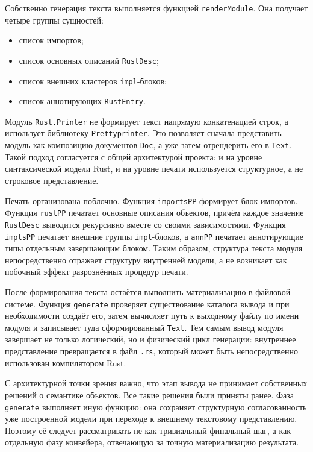 \documentclass[a4paper,12pt]{article}
\begin{document}
Собственно генерация текста выполняется функцией \texttt{renderModule}. Она получает
четыре группы сущностей:
\begin{itemize}
  \item список импортов;
  \item список основных описаний \texttt{RustDesc};
  \item список внешних кластеров \texttt{impl}-блоков;
  \item список аннотирующих \texttt{RustEntry}.
\end{itemize}

Модуль \texttt{Rust.Printer} не формирует текст напрямую конкатенацией строк, а
использует библиотеку \texttt{Prettyprinter}. Это позволяет сначала представить модуль
как композицию документов \texttt{Doc}, а уже затем отрендерить его в \texttt{Text}.
Такой подход согласуется с общей архитектурой проекта: и на уровне синтаксической модели
Rust, и на уровне печати используется структурное, а не строковое представление.

Печать организована поблочно. Функция \texttt{importsPP} формирует блок импортов.
Функция \texttt{rustPP} печатает основные описания объектов, причём каждое значение
\texttt{RustDesc} выводится рекурсивно вместе со своими зависимостями. Функция
\texttt{implsPP} печатает внешние группы \texttt{impl}-блоков, а \texttt{annPP}
печатает аннотирующие типы отдельным завершающим блоком. Таким образом, структура
текста модуля непосредственно отражает структуру внутренней модели, а не возникает как
побочный эффект разрознённых процедур печати.

После формирования текста остаётся выполнить материализацию в файловой системе.
Функция \texttt{generate} проверяет существование каталога вывода и при необходимости
создаёт его, затем вычисляет путь к выходному файлу по имени модуля и записывает туда
сформированный \texttt{Text}. Тем самым вывод модуля завершает не только логический, но
и физический цикл генерации: внутреннее представление превращается в файл \texttt{.rs},
который может быть непосредственно использован компилятором Rust.

С архитектурной точки зрения важно, что этап вывода не принимает собственных решений о
семантике объектов. Все такие решения были приняты ранее. Фаза \texttt{generate}
выполняет иную функцию: она сохраняет структурную согласованность уже построенной модели
при переходе к внешнему текстовому представлению. Поэтому её следует рассматривать не
как тривиальный финальный шаг, а как отдельную фазу конвейера, отвечающую за точную
материализацию результата.
\end{document}
